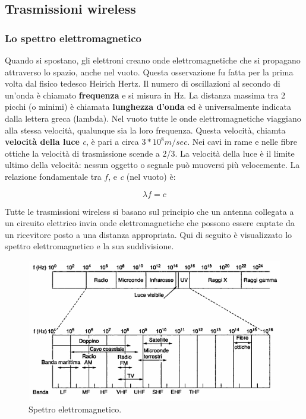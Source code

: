 \newpage

\subsection{Trasmissioni wireless}

\subsubsection{Lo spettro elettromagnetico}

Quando si spostano, gli elettroni creano onde elettromagnetiche che si propagano attraverso lo spazio, anche nel vuoto. Questa osservazione fu fatta per la prima volta dal fisico tedesco Heirich Hertz. Il numero di oscillazioni al secondo di un'onda è chiamato \textbf{frequenza} e si misura in Hz. La distanza massima tra 2 picchi (o minimi) è chiamata \textbf{lunghezza d'onda} ed è universalmente indicata dalla lettera greca \lambda (lambda).
Nel vuoto tutte le onde elettromagnetiche viaggiano alla stessa velocità, qualunque sia la loro frequenza. Questa velocità, chiamta \textbf{velocità della luce} \textit{c}, è pari a circa $3*10^8 m/sec$. Nei cavi in rame e nelle fibre ottiche la velocità di trasmissione scende a 2/3. La velocità della luce è il limite ultimo della velocità: nessun oggetto o segnale può muoversi più velocemente.
La relazione fondamentale tra $f$, \lambda e \textit{c} (nel vuoto) è:

$$\lambda f = c$$

Tutte le trasmissioni wireless si basano sul principio che un antenna collegata a un circuito elettrico invia onde elettromagnetiche che possono essere captate da un ricevitore posto a una distanza appropriata. Qui di seguito è visualizzato lo spettro elettromagnetico e la sua suddivisione.

\begin{figure}[htpb]
\centering
\includegraphics[scale=1]{images/spettro.png}
\caption{Spettro elettromagnetico.}
\end{figure}


